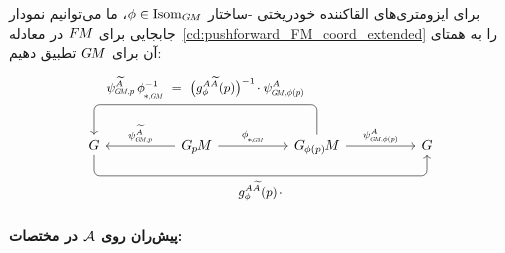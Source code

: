 برای ایزومتری‌های القاکننده خودریختی -ساختار $\phi \in \operatorname{Isom}_{G\mkern-1.4muM}$، ما می‌توانیم نمودار جابجایی برای $F\mkern-1.5muM$ در معادله~\eqref{cd:pushforward_FM_coord_extended} را به همتای آن برای $G\mkern-1.4muM$ تطبیق دهیم:
\begin{equation}\label{cd:pushforward_GM_coord_extended}
    \begin{tikzcd}[row sep=4.em, column sep=5em]
        G
            \arrow[rrr, pos=.5, rounded corners, to path={ 
                    -- ([yshift=-3.5ex]\tikztostart.south) 
                    --node[below]{\small$
                        g_\phi^{A\widetilde{A}}(p) \mkern2mu\cdot
                        $} ([yshift=-3.5ex]\tikztotarget.south) 
                    -- (\tikztotarget.south)
                    }]
        &
        \GpM
            \arrow[l, "\psiGMp^{\widetilde{A}}"']
            \arrow[r, "\dphiGM"]
        &
        \GphipM
            \arrow[r, "\psiGMphip^A"]
            \arrow[ll, pos=.5, rounded corners, to path={ 
                    -- ([yshift=5.ex]\tikztostart.north) 
                    --node[above]{\small$
                        \psiGMp^{\widetilde{A}}\, \dphiGM^{-1}\ =\ 
                        \big( g_\phi^{A\widetilde{A}}(p) \big)^{-1} \mkern-2mu\cdot \psiGMphip^A
                        $} ([yshift=5.ex]\tikztotarget.north) 
                    -- (\tikztotarget.north)
                    }]
        &
        G
    \end{tikzcd}
\end{equation}
















\paragraph{پیش‌ران روی $\mathcal{A}$ در مختصات:}

